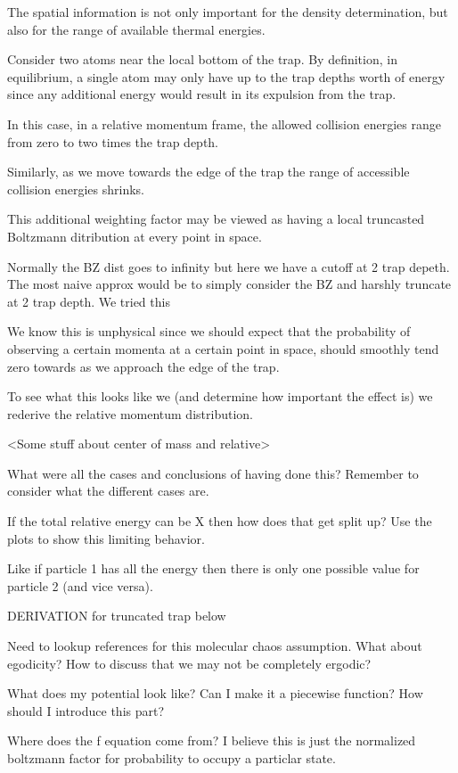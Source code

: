 The spatial information is not only important for the density determination, but also for the range of available thermal energies.

Consider two atoms near the local bottom of the trap. By definition, in equilibrium, a single atom may only have up to the trap depths worth of energy since any additional energy would result in its expulsion from the trap.

In this case, in a relative momentum frame, the allowed collision energies range from zero to two times the trap depth.

Similarly, as we move towards the edge of the trap the range of accessible collision energies shrinks.

This additional weighting factor may be viewed as having a local truncasted Boltzmann ditribution at every point in space. 

Normally the BZ dist goes to infinity but here we have a cutoff at 2 trap depeth.
The most naive approx would be to simply consider the BZ and harshly truncate at 2 trap depth. We tried this

We know this is unphysical since we should expect that the probability of observing a certain momenta at a certain point in space, should smoothly tend zero towards as we approach the edge of the trap.

To see what this looks like we (and determine how important the effect is) we rederive the relative momentum distribution.

<Some stuff about center of mass and relative>

What were all the cases and conclusions of having done this? Remember to consider what the different cases are.

If the total relative energy can be X then how does that get split up? Use the plots to show this limiting behavior.

Like if particle 1 has all the energy then there is only one possible value for particle 2 (and vice versa).

DERIVATION for truncated trap below

Need to lookup references for this molecular chaos assumption. What about egodicity? How to discuss that we may not be completely ergodic?

What does my potential look like? Can I make it a piecewise function? How should I introduce this part?

Where does the f equation come from? I believe this is just the normalized boltzmann factor for probability to occupy a particlar state.

